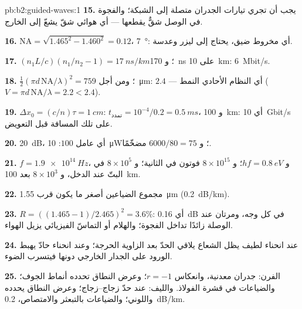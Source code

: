 \begin{solution}{pb:b2:guided-waves:1}
\textbf{15.} يجب أن تجري تيارات الجدران متصلة إلى الشبكة؛
والفجوة في الوصل شقٌّ يقطعها --- أي هوائي شقّ
يشعّ إلى الخارج.

\textbf{16.} $\mathrm{NA} = \sqrt{1.465^2 - 1.460^2} = 0.12$، \qty{7}{\degree}: أي مخروط
ضيق، يحتاج إلى ليزر وعدسة.

\textbf{17.} $(n_1L/c)(n_1/n_2 - 1) = \qty{17}{ns/km}$؛ و \qty{170}{ns} على \qty{10}{km}:
\qty{6}{Mbit/s}.

\textbf{18.} $\tfrac12(\pi d\,\mathrm{NA}/\lambda)^2 = 75$؛ ومن أجل \qty{9}{\micro m}: $2.4$ --- أي
النظام الأحادي النمط ($V = \pi d\,\mathrm{NA}/\lambda = 2.2 < 2.4$).

\textbf{19.} $\Delta x_0 = (c/n)\tau = \qty{1}{cm}$: $t_{\text{تمدد}} = 10^{-4}/0.2 = \qty{0.5}{ms}$،
و \qty{100}{km}: أي \qty{10}{Gbit/s} على تلك المسافة قبل التعويض.

\textbf{20.} \qty{20}{dB}، أي عامل $100$: \qty{10}{\micro W}؛ و $6000/80 = 75$
مضخّمًا.

\textbf{21.} $f = \qty{1.9e14}{Hz}$، و $hf = \qty{0.8}{eV}$؛ و $8 \times 10^{15}$ فوتون في
الثانية؛ و $8 \times 10^5$ في البتّ عند الدخل، و $8 \times 10^3$ بعد \qty{100}{km}.

\textbf{22.} مجموع الضياعين أصغر ما يكون قرب \qty{1.55}{\micro m}
(\qty{0.2}{dB/km}).

\textbf{23.} $R = ((1.465 - 1)/2.465)^2 = 3.6\%$: أي \qty{0.16}{dB} في كل وجه، ومرتان
عند الوصلة زائدًا تداخل الفجوة؛ والهلام أو التماسّ الفيزيائي
يزيل الهواء.

\textbf{24.} عند انحناء لطيف يظل الشعاع يلاقي الحدّ بعد
الزاوية الحرجة؛ وعند انحناء حادّ يهبط الورود على الجدار الخارجي
دونها فيتسرب الضوء.

\textbf{25.} الفرن: جدران معدنية، وانعكاس $r = -1$؛ وعرض النطاق تحدده
أنماط الجوف؛ والضياعات في قشرة الفولاذ. والليف:  عند حدّ زجاج--زجاج؛ وعرض النطاق يحدده 
واللوني؛ والضياعات بالتبعثر والامتصاص، \qty{0.2}{dB/km}.
\end{solution}
